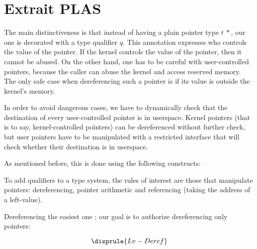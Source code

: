 



\section*{Extrait PLAS}

The main distinctiveness is that instead of having a plain pointer type
$t~*$, our one is decorated with a type qualifier $q$. This annotation expresses
who controls the value of the pointer. If the kernel controls the value of the
pointer, then it cannot be abused. On the other hand, one has to be careful
with user-controlled pointers, because the caller can abuse the kernel and
access reserved memory. The only safe case when dereferencing such a pointer is
if its value is outside the kernel's memory.

In order to avoid dangerous cases, we have to dynamically check that the
destination of every user-controlled pointer is in userspace. Kernel pointers
(that is to say, kernel-controlled pointers) can be dereferenced without further
check, but user pointers have to be manipulated with a restricted interface that
will check whether their destination is in userspace.

As mentioned before, this is done using the following constructs:%
{\small
\begin{mathpar}

\end{mathpar}}%
To add qualifiers to a type system, the rules of interest are those that
manipulate pointers: dereferencing, pointer arithmetic and referencing (taking
the address of a left-value).

Dereferencing the easiest one ; our goal is to authorize dereferencing only
\qKernel pointers:

{\small \[ \disprule{Lv-Deref} \]}%

